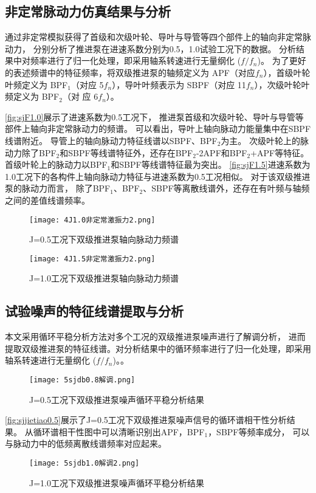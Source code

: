 \subsection{非定常脉动力仿真结果与分析}
通过非定常模拟获得了首级和次级叶轮、导叶与导管等四个部件上的轴向非定常脉动力，
分别分析了推进泵在进速系数分别为0.5，1.0试验工况下的数据。
分析结果中对频率进行了归一化处理，即采用轴系转速进行无量纲化 ($f/f_n$)。
为了更好的表述频谱中的特征频率，将双级推进泵的轴频定义为 APF（对应$f_n$），首级叶轮叶频定义为
BPF$_1$（对应 5$f_n$），导叶叶频表示为 SBPF（对应 11$f_n$），次级叶轮叶频定义为 BPF$_2$（对
应 6$f_n$）。

\autoref{fig:sjF1.0}展示了进速系数为0.5工况下，
推进泵首级和次级叶轮、导叶与导管等部件上轴向非定常脉动力的频谱。
可以看出，导叶上轴向脉动力能量集中在SBPF线谱附近。
导管上的轴向脉动力特征线谱以SBPF、BPF$_2$为主。
次级叶轮上的脉动力除了BPF$_2$和SBPF等线谱特征外，还存在BPF$_2$-2APF和BPF$_2$+APF等特征。
首级叶轮上的脉动力以BPF$_1$和SBPF等线谱特征最为突出。
\autoref{fig:sjF1.5}进速系数为1.0工况下的各构件上轴向脉动力特征与进速系数为0.5工况相似。
对于该双级推进泵的脉动力而言，
除了BPF$_1$、BPF$_2$、SBPF等离散线谱外，还存在有叶频与轴频之间的差值线谱频率。
\begin{comment}
\begin{figure}[htbp]
    \centering
    \texttt{[image: 4J0.5非定常激振力1.png]}
    \caption{\label{fig:sjF0.5}J=0.5工况下双级推进泵轴向脉动力频谱}
\end{figure}
\end{comment}
\begin{figure}[htbp]
    \centering
    \texttt{[image: 4J1.0非定常激振力2.png]}
    \caption{\label{fig:sjF1.0}J=0.5工况下双级推进泵轴向脉动力频谱}
\end{figure}
\begin{figure}[htbp]
    \centering
    \texttt{[image: 4J1.5非定常激振力2.png]}
    \caption{\label{fig:sjF1.5}J=1.0工况下双级推进泵轴向脉动力频谱}
\end{figure}
\subsection{试验噪声的特征线谱提取与分析}
本文采用循环平稳分析方法对多个工况的双级推进泵噪声进行了解调分析，
进而提取双级推进泵的特征线谱。对分析结果中的循环频率进行了归一化处理，即采用轴系转速进行无量纲化 ($f/f_n$)。。

\begin{figure}[htbp]
    \centering
    \texttt{[image: 5sjdb0.8解调.png]}
    \caption{\label{fig:sjjietiao0.5}J=0.5工况下双级推进泵噪声循环平稳分析结果}
\end{figure}
\autoref{fig:sjjietiao0.5}展示了J=0.5工况下双级推进泵噪声信号的循环谱相干性分析结果。
从循环谱相干性图中可以清晰识别出APF，BPF$_1$，SBPF等频率成分，
可以与脉动力中的低频离散线谱频率对应起来。
\begin{comment}
\end{comment}
\begin{figure}[htbp]
    \centering
    \texttt{[image: 5sjdb1.0解调2.png]}
    \caption{\label{fig:sjjietiao1.0}J=1.0工况下双级推进泵噪声循环平稳分析结果}
\end{figure}

